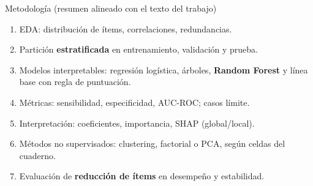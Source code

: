 \documentclass[11pt]{beamer}
\begin{document}
\begin{frame}{Metodología (resumen alineado con el texto del trabajo)}
  \begin{enumerate}
    \setlength{\itemsep}{0.2em}
    \footnotesize
    \item EDA: distribución de ítems, correlaciones, redundancias.
    \item Partición \textbf{estratificada} en entrenamiento, validación y prueba.
    \item Modelos interpretables: regresión logística, árboles, \textbf{Random Forest} y línea base con regla de puntuación.
    \item Métricas: sensibilidad, especificidad, AUC-ROC; casos límite.
    \item Interpretación: coeficientes, importancia, SHAP (global/local).
    \item Métodos no supervisados: clustering, factorial o PCA, según celdas del cuaderno.
    \item Evaluación de \textbf{reducción de ítems} en desempeño y estabilidad.
  \end{enumerate}
\end{frame}
\end{document}
